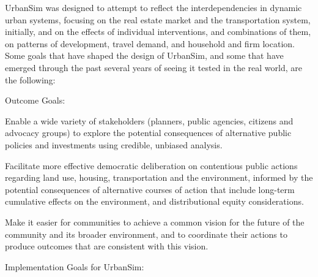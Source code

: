 UrbanSim was designed to attempt to reflect the interdependencies in dynamic urban systems, focusing on the real estate market and the transportation system, initially, and on the effects of individual interventions, and combinations of them, on patterns of development, travel demand, and household and firm location.  Some goals that have shaped the design of UrbanSim, and some that have emerged through the past several years of seeing it tested in the real world, are the following:

Outcome Goals:

\squishlist
\item Enable a wide variety of stakeholders (planners, public agencies, citizens and advocacy groups) to explore the potential consequences of alternative public policies and investments using credible, unbiased analysis.
\item Facilitate more effective democratic deliberation on contentious public actions regarding land use, housing, transportation and the environment, informed by the potential consequences of alternative courses of action that include long-term cumulative effects on the environment, and distributional equity considerations.
\item Make it easier for communities to achieve a common vision for the future of the community and its broader environment, and to coordinate their actions to produce outcomes that are consistent with this vision.
\squishend

Implementation Goals for UrbanSim:

